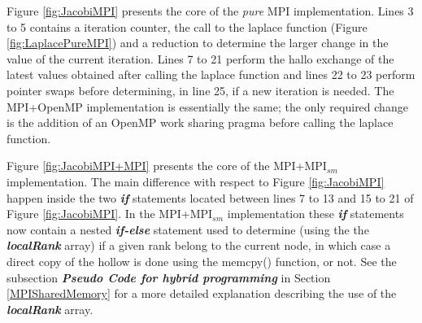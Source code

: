 \medskip

Figure \ref{fig:JacobiMPI} presents the core of the \emph{pure} MPI implementation. Lines 3 to 5 contains a iteration counter, the call to the laplace function (Figure \ref{fig:LaplacePureMPI}) and a reduction to determine the larger change in the value of the current iteration. Lines 7 to 21 perform the hallo exchange of the latest values obtained after calling the laplace function and lines 22 to 23 perform pointer swaps before determining, in line 25, if a new iteration is needed. The MPI+OpenMP implementation is essentially the same; the only required change is the addition of an OpenMP work sharing pragma before calling the laplace function.

\medskip

Figure \ref{fig:JacobiMPI+MPI} presents the core of the MPI+MPI$_{sm}$ implementation. The main difference with respect to Figure \ref{fig:JacobiMPI} happen inside the two \emph{\textbf{if}} statements located between lines 7 to 13 and 15 to 21 of Figure \ref{fig:JacobiMPI}. In the MPI+MPI$_{sm}$ implementation these \emph{\textbf{if}} statements now contain a nested \emph{\textbf{if-else}} statement used to determine (using the the \emph{\textbf{localRank}} array) if a given rank belong to the current node, in which case a direct copy of the hollow is done using the memcpy() function, or not.  See the subsection \emph{\textbf{Pseudo Code for hybrid programming}} in Section \ref{MPISharedMemory} for a more detailed explanation describing the use of the \emph{\textbf{localRank}} array.

